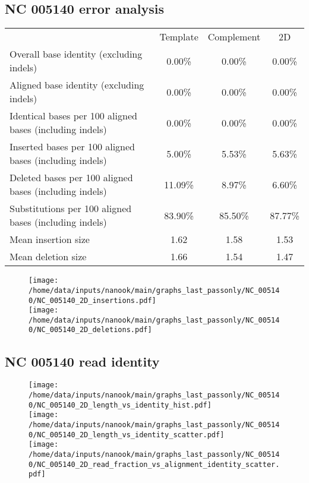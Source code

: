 \documentclass[a4paper,11pt,oneside]{article}
\begin{document}
\subsection*{NC 005140 error analysis}
\vspace{-3mm}
\begin{table}[H]
{\footnotesize
\fontsize{9pt}{11pt}\selectfont
\begin{tabular}{l c c c}
 & Template & Complement & 2D \\
Overall base identity (excluding indels) & 0.00\% & 0.00\% & 0.00\% \\
Aligned base identity (excluding indels) & 0.00\% & 0.00\% & 0.00\% \\
Identical bases per 100 aligned bases (including indels) & 0.00\% & 0.00\% & 0.00\% \\
Inserted bases per 100 aligned bases (including indels) & 5.00\% & 5.53\% & 5.63\% \\
Deleted bases per 100 aligned bases (including indels) & 11.09\% & 8.97\% & 6.60\% \\
Substitutions per 100 aligned bases (including indels) & 83.90\% & 85.50\% & 87.77\% \\
Mean insertion size & 1.62 & 1.58 & 1.53 \\
Mean deletion size & 1.66 & 1.54 & 1.47 \\
\end{tabular}
}
\end{table}
\vspace{-5mm}
\begin{figure}[H]
\centering
  \texttt{[image: /home/data/inputs/nanook/main/graphs\_last\_passonly/NC\_005140/NC\_005140\_2D\_insertions.pdf]} \\
  \texttt{[image: /home/data/inputs/nanook/main/graphs\_last\_passonly/NC\_005140/NC\_005140\_2D\_deletions.pdf]}
\end{figure}
\subsection*{NC 005140 read identity}
\vspace{-3mm}
\begin{figure}[H]
\centering
  \texttt{[image: /home/data/inputs/nanook/main/graphs\_last\_passonly/NC\_005140/NC\_005140\_2D\_length\_vs\_identity\_hist.pdf]} \\
  \texttt{[image: /home/data/inputs/nanook/main/graphs\_last\_passonly/NC\_005140/NC\_005140\_2D\_length\_vs\_identity\_scatter.pdf]} \\
  \texttt{[image: /home/data/inputs/nanook/main/graphs\_last\_passonly/NC\_005140/NC\_005140\_2D\_read\_fraction\_vs\_alignment\_identity\_scatter.pdf]}
\end{figure}
\begin{figure}[H]
\centering
   \end{figure}
\end{document}
